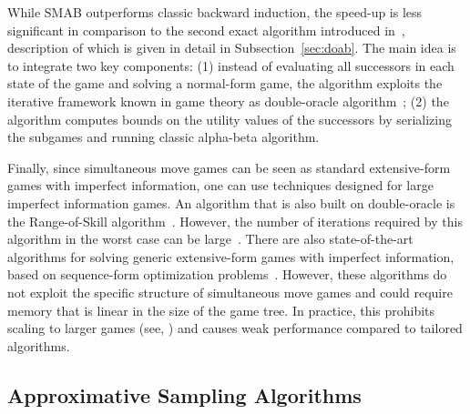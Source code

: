 While SMAB outperforms classic backward induction, the speed-up is less significant in comparison to the second exact algorithm introduced in~\cite{Bosansky13Using}, description of which is given in detail in Subsection~\ref{sec:doab}.
The main idea is to integrate two key components: (1) instead of evaluating all successors in each state of the game and solving a normal-form game, the algorithm exploits the iterative framework known in game theory as double-oracle algorithm~\cite{McMahan03Planning}; (2) the algorithm computes bounds on the utility values of the successors by serializing the subgames and running classic alpha-beta algorithm. 

Finally, since simultaneous move games can be seen as standard extensive-form games with imperfect information, one can use techniques 
designed for large imperfect information games. 
An algorithm that is also built on double-oracle is the Range-of-Skill algorithm~\cite{Zinkevich07New}.  
However, the number of iterations required by this algorithm in the worst case can be large~\cite{Hansen08On}. 
There are also state-of-the-art algorithms for solving generic extensive-form games with imperfect information, based on sequence-form 
optimization problems~\cite{koller1996,Sandholm10The,bosansky2013-aamas}. 
However, these algorithms do not exploit the specific structure of simultaneous move games and could require memory that is linear 
in the size of the game tree. In practice, this prohibits scaling to larger games (see, \eg \cite{Saffidine12SMAB}) and causes weak performance
compared to tailored algorithms.


\subsection{Approximative Sampling Algorithms} \label{sec:related:sampling}


